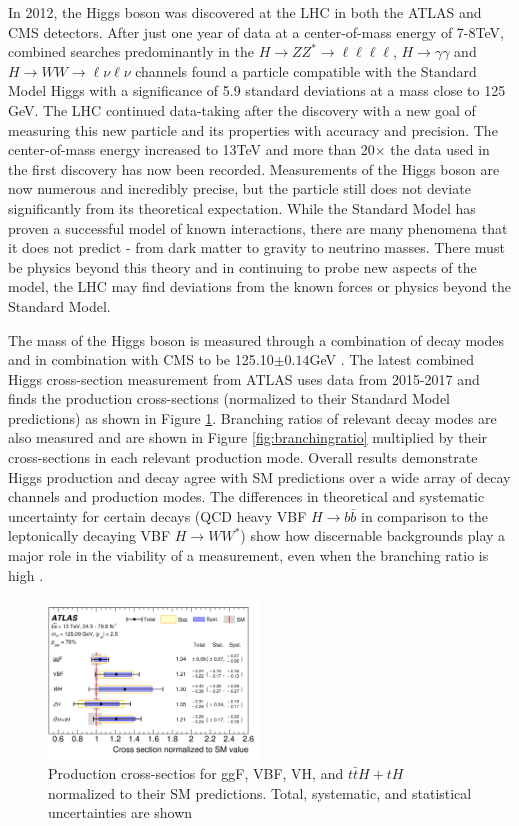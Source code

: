 In 2012, the Higgs boson was discovered at the LHC in both the ATLAS and CMS detectors. After just one year of data at a center-of-mass energy of 7-8TeV, combined searches predominantly in the $H\rightarrow ZZ^*\rightarrow \ell\ell\ell\ell$, $H\rightarrow \gamma\gamma$ and $H\rightarrow WW \rightarrow \ell\nu\ell\nu$ channels found a particle compatible with the Standard Model Higgs with a significance of 5.9 standard deviations at a mass close to 125 GeV. The LHC continued data-taking after the discovery with a new goal of measuring this new particle and its properties with accuracy and precision. The center-of-mass energy increased to 13TeV and more than 20$\times$ the data used in the first discovery has now been recorded. Measurements of the Higgs boson are now numerous and incredibly precise, but the particle still does not deviate significantly from its theoretical expectation. While the Standard Model has proven a successful model of known interactions, there are many phenomena that it does not predict - from dark matter to gravity to neutrino masses. There must be physics beyond this theory and in continuing to probe new aspects of the model, the LHC may find deviations from the known forces or physics beyond the Standard Model.

The mass of the Higgs boson is measured through a combination of decay modes and in combination with CMS to be 125.10$\pm 0.14$GeV \cite{PDG}. The latest combined Higgs cross-section measurement from ATLAS uses data from 2015-2017 and finds the production cross-sections (normalized to their Standard Model predictions) as shown in Figure \ref{fig:productioncrosssection}. Branching ratios of relevant decay modes are also measured and are shown in Figure \ref{fig:branchingratio} multiplied by their cross-sections in each relevant production mode. Overall results demonstrate Higgs production and decay agree with SM predictions over a wide array of decay channels and production modes. The differences in theoretical and systematic uncertainty for certain decays (QCD heavy VBF $H\rightarrow b\bar{b}$ in comparison to the leptonically decaying VBF $H\rightarrow WW^*$) show how discernable backgrounds play a major role in the viability of a measurement, even when the branching ratio is high \cite{HiggsCurrent}.  
\begin{figure}[H]
        \centering
    \includegraphics[width=0.5\textwidth] {Pictures/productioncrosssection.png}\hspace{1cm}
    \caption{Production cross-sectios for ggF, VBF, VH, and $t\bar{t}H+tH$ normalized to their SM predictions. Total, systematic, and statistical uncertainties are shown \cite{HiggsCurrent}}
    \label{fig:productioncrosssection}
\end{figure}

